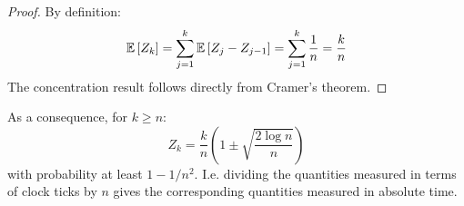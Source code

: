 \documentclass{article}
\begin{document}
\begin{proof}
By definition:
\begin{equation}
{\mathbb{E}}\left[Z_k\right] = \sum_{j=1}^k {\mathbb{E}}\left[Z_j - Z_{j-1}\right] = \sum_{j=1}^k \frac{1}{n} = \frac{k}{n}
\end{equation}
The concentration result follows directly from Cramer's theorem.
\end{proof}
As a consequence, for \(k\geq n\):
\begin{equation}
Z_k = \frac{k}{n}\left(1\pm\sqrt{\frac{2\log{n}}{n}}\right)
\end{equation}
with probability at least \(1 - 1/n^2\). I.e. dividing the quantities measured in terms of clock ticks by \(n\) gives the corresponding quantities measured in absolute time. 
\end{document}
